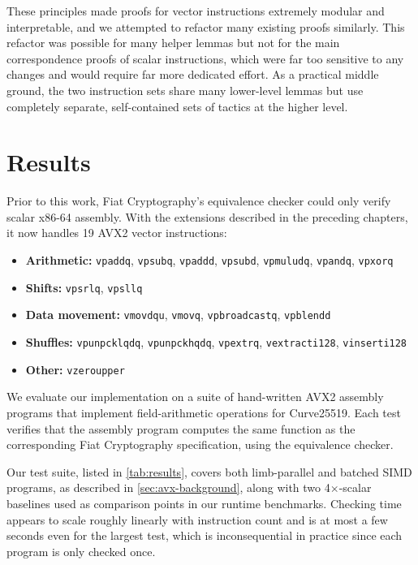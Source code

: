 These principles made proofs for vector instructions extremely modular and interpretable, and we attempted to refactor many existing proofs similarly. This refactor was possible for many helper lemmas but not for the main correspondence proofs of scalar instructions, which were far too sensitive to any changes and would require far more dedicated effort. As a practical middle ground, the two instruction sets share many lower-level lemmas but use completely separate, self-contained sets of tactics at the higher level.

\chapter{Results}
\label{ch:results}

Prior to this work, Fiat Cryptography's equivalence checker could only verify scalar x86-64 assembly.
With the extensions described in the preceding chapters, it now handles 19 AVX2 vector instructions:

\begin{itemize}
    \item \textbf{Arithmetic:} \texttt{vpaddq}, \texttt{vpsubq}, \texttt{vpaddd}, \texttt{vpsubd}, \texttt{vpmuludq}, \texttt{vpandq}, \texttt{vpxorq}
    \item \textbf{Shifts:} \texttt{vpsrlq}, \texttt{vpsllq}
    \item \textbf{Data movement:} \texttt{vmovdqu}, \texttt{vmovq}, \texttt{vpbroadcastq}, \texttt{vpblendd}
    \item \textbf{Shuffles:} \texttt{vpunpcklqdq}, \texttt{vpunpckhqdq}, \texttt{vpextrq}, \texttt{vextracti128}, \texttt{vinserti128}
    \item \textbf{Other:} \texttt{vzeroupper}
\end{itemize}

We evaluate our implementation on a suite of hand-written AVX2 assembly programs that implement field-arithmetic operations for Curve25519.
Each test verifies that the assembly program computes the same function as the corresponding Fiat Cryptography specification, using the equivalence checker.

Our test suite, listed in \autoref{tab:results}, covers both limb-parallel and batched SIMD programs, as described in \autoref{sec:avx-background}, along with two 4$\times$-scalar baselines used as comparison points in our runtime benchmarks.
Checking time appears to scale roughly linearly with instruction count and is at most a few seconds even for the largest test, which is inconsequential in practice since each program is only checked once.

